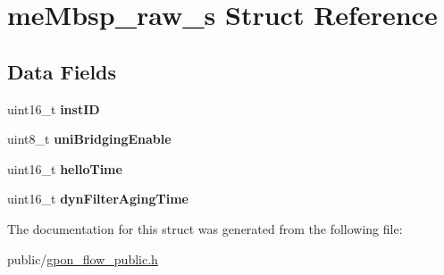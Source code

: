\hypertarget{structmeMbsp__raw__s}{}\section{me\+Mbsp\+\_\+raw\+\_\+s Struct Reference}
\label{structmeMbsp__raw__s}
\subsection*{Data Fields}
\begin{DoxyCompactItemize}
\item 
\mbox{\label{structmeMbsp__raw__s_a78c2ea875645fcc5bfb3fa2b731696f0}} 
uint16\+\_\+t {\bfseries inst\+ID}
\item 
\mbox{\label{structmeMbsp__raw__s_ab61185ce19e11cf4d42ef0f902ef5bda}} 
uint8\+\_\+t {\bfseries uni\+Bridging\+Enable}
\item 
\mbox{\label{structmeMbsp__raw__s_a02c309b9af42d8b8af3f3229f1161e47}} 
uint16\+\_\+t {\bfseries hello\+Time}
\item 
\mbox{\label{structmeMbsp__raw__s_acdedb867fe1a7dd898f239fa54d7e588}} 
uint16\+\_\+t {\bfseries dyn\+Filter\+Aging\+Time}
\end{DoxyCompactItemize}


The documentation for this struct was generated from the following file\+:\begin{DoxyCompactItemize}
\item 
public/\hyperlink{gpon__flow__public_8h}{gpon\+\_\+flow\+\_\+public.\+h}\end{DoxyCompactItemize}
